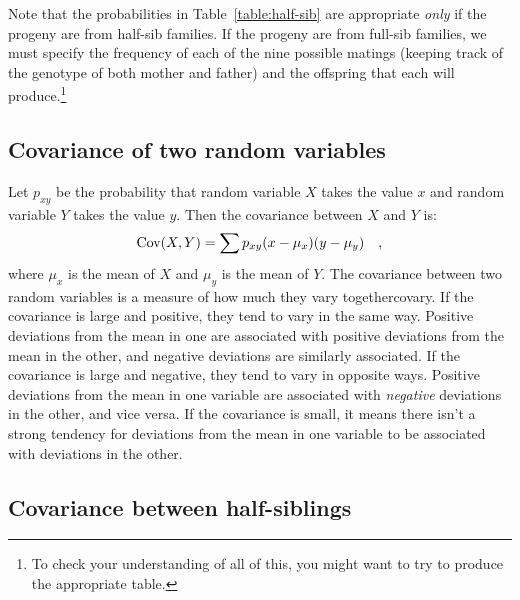 \documentclass[12pt]{article}
\begin{document}
Note that the probabilities in Table~\ref{table:half-sib} are
appropriate {\it only\/} if the progeny are from half-sib families.
If the progeny are from full-sib families, we must specify the
frequency of each of the nine possible matings (keeping track of the
genotype of both mother and father) and the offspring that each will
produce.\footnote{To check your understanding of all of this, you
  might want to try to produce the appropriate table.}

\subsection*{Covariance of two random variables}

Let $p_{xy}$ be the probability that random variable $X$ takes the
value $x$ and random variable $Y$ takes the value $y$.  Then the
covariance between $X$ and $Y$ is:
\[
\mbox{Cov}(X,Y) = \sum p_{xy}(x - \mu_x)(y - \mu_y) \quad ,
\]
where $\mu_x$ is the mean of $X$ and $\mu_y$ is the mean of $Y$. The
covariance between two random variables is a measure of how much they
vary together{\dash}covary. If the covariance is large and positive,
they tend to vary in the same way. Positive deviations from the mean
in one are associated with positive deviations from the mean in the
other, and negative deviations are similarly associated. If the
covariance is large and negative, they tend to vary in opposite
ways. Positive deviations from the mean in one variable are associated
with {\it negative\/} deviations in the other, and vice versa. If the
covariance is small, it means there isn't a strong tendency for
deviations from the mean in one variable to be associated with
deviations in the other.

\subsection*{Covariance between half-siblings}
\end{document}
